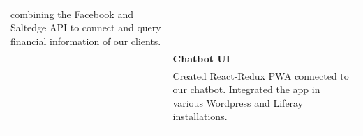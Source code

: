 \documentclass[11pt]{article}
\begin{document}
\begin{tabularx}{\textwidth}{lX}
                           combining the Facebook and Saltedge API to connect
                           and query financial information of our clients. \\[1.5mm]
                         & \textbf{Chatbot UI} \\
                         & Created React-Redux PWA connected to our chatbot.
                           Integrated the app in various Wordpress and Liferay
                           installations. \\\\

  
  
  
  
  
  

\end{tabularx}
\end{document}
